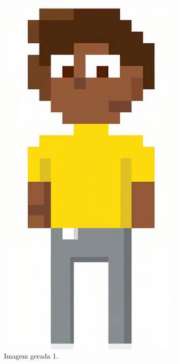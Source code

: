 \begin{figure}[htbp]
\begin{subfigure}{0.15\linewidth}
        \includegraphics[width=1\linewidth]{figs/cgDream/res_img_FluxFast1a.png}
        \caption{\small Imagem gerada 1.}
        \label{fig:cgDream3b}
    \end{subfigure}
    \begin{subfigure}{0.15\linewidth}

\end{subfigure}
\end{figure}

